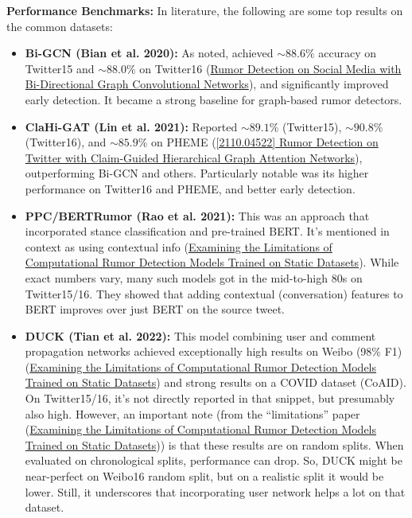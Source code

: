 \documentclass[12pt,a4paper]{report}
\begin{document}
\textbf{Performance Benchmarks:} In literature, the following are some top results on the common datasets:
\begin{itemize}[leftmargin=1.2cm]
    \item \textbf{Bi-GCN (Bian et al. 2020):} As noted, achieved \(\sim88.6\%\) accuracy on Twitter15 and \(\sim88.0\%\) on Twitter16 (\href{https://ojs.aaai.org/index.php/AAAI/article/view/5393/5249#:~:text=RvNN%200,526}{Rumor Detection on Social Media with Bi-Directional Graph Convolutional Networks}), and significantly improved early detection. It became a strong baseline for graph-based rumor detectors.
    \item \textbf{ClaHi-GAT (Lin et al. 2021):} Reported \(\sim89.1\%\) (Twitter15), \(\sim90.8\%\) (Twitter16), and \(\sim85.9\%\) on PHEME (\href{https://ar5iv.org/pdf/2110.04522#:~:text=Method%20Twitter15%20Twitter16%20PHEME%20Acc,GAT%2FDT%200.813%200.848%200.837}{[2110.04522] Rumor Detection on Twitter with Claim-Guided Hierarchical Graph Attention Networks}), outperforming Bi-GCN and others. Particularly notable was its higher performance on Twitter16 and PHEME, and better early detection.
    \item \textbf{PPC/BERTRumor (Rao et al. 2021):} This was an approach that incorporated stance classification and pre-trained BERT. It’s mentioned in context as using contextual info (\href{https://arxiv.org/html/2309.11576v2#:~:text=Recent%20hybrid%20models%20began%20including,Ma}{Examining the Limitations of Computational Rumor Detection Models Trained on Static Datasets}). While exact numbers vary, many such models got in the mid-to-high 80s on Twitter15/16. They showed that adding contextual (conversation) features to BERT improves over just BERT on the source tweet.
    \item \textbf{DUCK (Tian et al. 2022):} This model combining user and comment propagation networks achieved exceptionally high results on Weibo (98\% F1) (\href{https://arxiv.org/html/2309.11576v2#:~:text=Recent%20hybrid%20models%20began%20including,Ma}{Examining the Limitations of Computational Rumor Detection Models Trained on Static Datasets}) and strong results on a COVID dataset (CoAID). On Twitter15/16, it’s not directly reported in that snippet, but presumably also high. However, an important note (from the “limitations” paper (\href{https://arxiv.org/html/2309.11576v2#:~:text=Recent%20hybrid%20models%20began%20including,Cui%20and%20Lee%2C%20%2056}{Examining the Limitations of Computational Rumor Detection Models Trained on Static Datasets})) is that these results are on random splits. When evaluated on chronological splits, performance can drop. So, DUCK might be near-perfect on Weibo16 random split, but on a realistic split it would be lower. Still, it underscores that incorporating user network helps a lot on that dataset.

\end{itemize}
\end{document}
